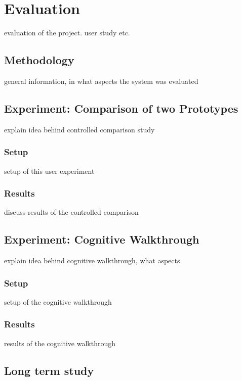 
\chapter{Evaluation}

evaluation of the project. user study etc.

\section{Methodology}

general information, in what aspects the system was evaluated

\section{Experiment: Comparison of two Prototypes}

explain idea behind controlled comparison study

\subsection{Setup}

setup of this user experiment

\subsection{Results}

discuss results of the controlled comparison

\section{Experiment: Cognitive Walkthrough}

explain idea behind cognitive walkthrough, what aspects

\subsection{Setup}

setup of the cognitive walkthrough

\subsection{Results}

results of the cognitive walkthrough

\section{Long term study}

